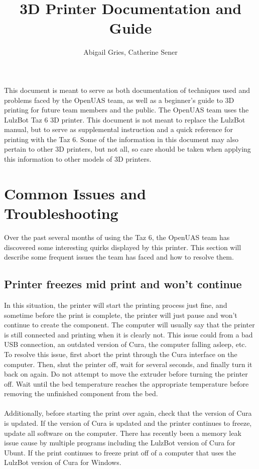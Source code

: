 \documentclass{article}
\begin{document}
\title{\textbf{3D Printer Documentation and Guide}}
\author{Abigail Gries, Catherine Sener}
\maketitle

This document is meant to serve as both documentation of techniques used and problems faced by the OpenUAS team, as well as a beginner's guide to 3D printing for future team members and the public. The OpenUAS team uses the LulzBot Taz 6 3D printer. This document is not meant to replace the LulzBot manual, but to serve as supplemental instruction and a quick reference for printing with the Taz 6. Some of the information in this document may also pertain to other 3D printers, but not all, so care should be taken when applying this information to other models of 3D printers. 

\section{Common Issues and Troubleshooting}

Over the past several months of using the Taz 6, the OpenUAS team has discovered some interesting quirks displayed by this printer. This section will describe some frequent issues the team has faced and how to resolve them.

\subsection{Printer freezes mid print and won't continue}

In this situation, the printer will start the printing process just fine, and sometime before the print is complete, the printer will just pause and won't continue to create the component. The computer will usually say that the printer is still connected and printing when it is clearly not. This issue could from a bad USB connection, an outdated version of Cura, the computer falling asleep, etc. To resolve this issue, first abort the print through the Cura interface on the computer. Then, shut the printer off, wait for several seconds, and finally turn it back on again. Do not attempt to move the extruder before turning the printer off. Wait until the bed temperature reaches the appropriate temperature before removing the unfinished component from the bed. 
\\
\\Additionally, before starting the print over again, check that the version of Cura is updated. If the version of Cura is updated and the printer continues to freeze, update all software on the computer. There has recently been a memory leak issue cause by multiple programs including the LulzBot version of Cura for Ubunt. If the print continues to freeze print off of a computer that uses the LulzBot version of Cura for Windows.
\end{document}

